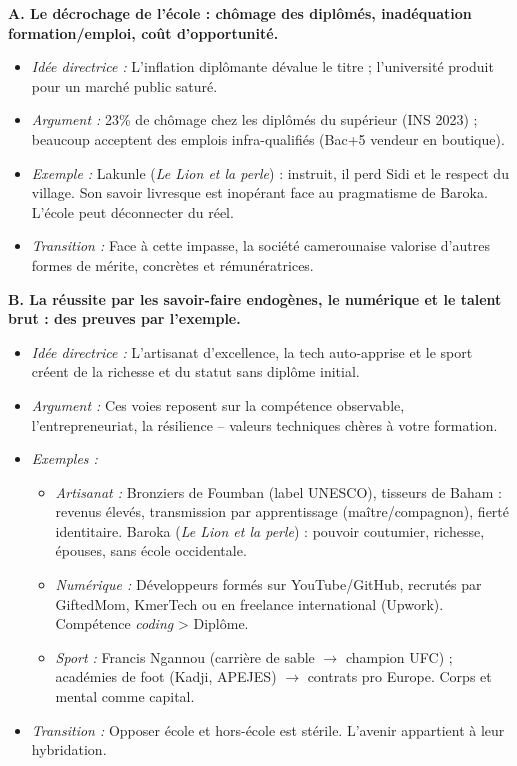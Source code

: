 \documentclass[11pt]{article}
\begin{document}
\begin{exoresolu}
\noindent\textbf{A. Le décrochage de l'école : chômage des diplômés, inadéquation formation/emploi, coût d'opportunité.}
\begin{itemize}
    \item \textit{Idée directrice :} L'inflation diplômante dévalue le titre ; l'université produit pour un marché public saturé.
    \item \textit{Argument :} 23\% de chômage chez les diplômés du supérieur (INS 2023) ; beaucoup acceptent des emplois infra-qualifiés (Bac+5 vendeur en boutique).
    \item \textit{Exemple :} Lakunle (\emph{Le Lion et la perle}) : instruit, il perd Sidi et le respect du village. Son savoir livresque est inopérant face au pragmatisme de Baroka. L'école peut déconnecter du réel.
    \item \textit{Transition :} Face à cette impasse, la société camerounaise valorise d'autres formes de mérite, concrètes et rémunératrices.
\end{itemize}

\noindent\textbf{B. La réussite par les savoir-faire endogènes, le numérique et le talent brut : des preuves par l'exemple.}
\begin{itemize}
    \item \textit{Idée directrice :} L'artisanat d'excellence, la tech auto-apprise et le sport créent de la richesse et du statut sans diplôme initial.
    \item \textit{Argument :} Ces voies reposent sur la compétence observable, l'entrepreneuriat, la résilience -- valeurs techniques chères à votre formation.
    \item \textit{Exemples :}
    \begin{itemize}
        \item \textit{Artisanat :} Bronziers de Foumban (label UNESCO), tisseurs de Baham : revenus élevés, transmission par apprentissage (maître/compagnon), fierté identitaire. Baroka (\emph{Le Lion et la perle}) : pouvoir coutumier, richesse, épouses, sans école occidentale.
        \item \textit{Numérique :} Développeurs formés sur YouTube/GitHub, recrutés par GiftedMom, KmerTech ou en freelance international (Upwork). Compétence \emph{coding} > Diplôme.
        \item \textit{Sport :} Francis Ngannou (carrière de sable $\rightarrow$ champion UFC) ; académies de foot (Kadji, APEJES) $\rightarrow$ contrats pro Europe. Corps et mental comme capital.
    \end{itemize}
    \item \textit{Transition :} Opposer école et hors-école est stérile. L'avenir appartient à leur hybridation.
\end{itemize}


\end{exoresolu}
\end{document}
